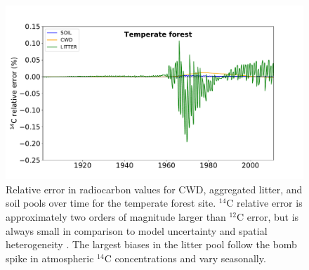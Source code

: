 \documentclass[draft]{agujournal2019}
\begin{document}
\begin{figure}[htbp]
        \centering 
        \includegraphics[width=1.0\linewidth]{figs/C14_through_time_rel_err_10.pdf}
        \caption{Relative error in radiocarbon values for CWD, aggregated litter, and soil pools over time for the temperate forest site. $^{14}$C relative error is approximately two orders of magnitude larger than $^{12}$C error, but is always small in comparison to model uncertainty and spatial heterogeneity \cite{Chen2009JGR, Lawrence2019}. The largest biases in the litter pool follow the bomb spike in atmospheric $^{14}$C concentrations and vary seasonally.}
        \label{fig:10dayErrorOverTime}
\end{figure}    
\end{document}
